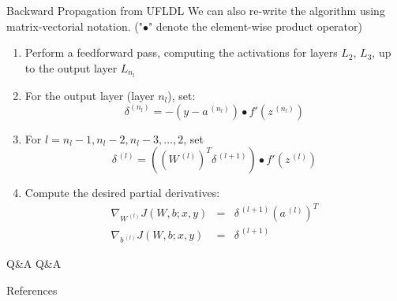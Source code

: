 \documentclass[10pt]{beamer}
\begin{document}
	\begin{frame}{Backward Propagation from UFLDL}
		We can also re-write the algorithm using matrix-vectorial notation. ("$\bullet$" denote the element-wise product operator)
		\begin{enumerate}
			\pause
			\item Perform a feedforward pass, computing the activations for layers $L_2$, $L_3$, up to the output layer $L_{n_l}$
			\pause
			\item For the output layer (layer $n_l$), set:
			$$\delta^{(n_l)}=-(y-a^{\,(n_l)})\bullet f'(z^{\,(n_l)})$$
			
			\pause
			\item For $l=n_l-1, n_l-2, n_l-3,\dots,2$, set
			$$\delta^{\,(l)}=\left((W^{\,(l)})^T\delta^{\,(l+1)}\right)\bullet f'(z^{\,(l)})$$
			
			\pause
			\item Compute the desired partial derivatives:
			\begin{eqnarray*}
				\nabla_{W^{\,(l)}}J(W,b;x,y)&=&\delta^{\,(l+1)}(a^{\,(l)})^T\\
				\nabla_{b^{\,(l)}}J(W,b;x,y)&=&\delta^{\,(l+1)}
			\end{eqnarray*}
		\end{enumerate}
	\end{frame}
	
	\begin{frame}{Q\&A}
		Q\&A
	\end{frame}


	\begin{frame}[allowframebreaks]{References}
		
		
	\end{frame}
\end{document}
